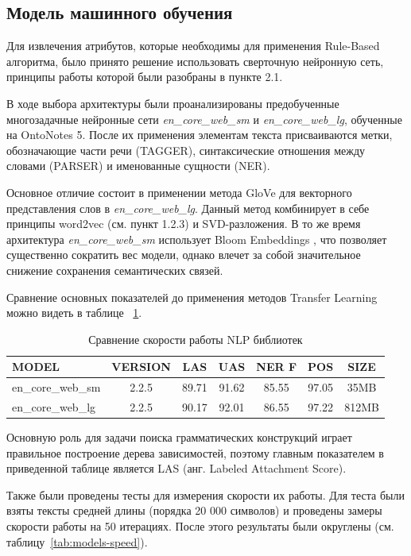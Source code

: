 \newpage
\subsection{Модель машинного обучения}
Для извлечения атрибутов, которые необходимы для применения Rule-Based алгоритма, было принято решение использовать сверточную нейронную сеть, принципы работы которой были разобраны в пункте 2.1.

В ходе выбора архитектуры были проанализированы предобученные многозадачные нейронные сети \emph{en\_core\_web\_sm} и  \emph{en\_core\_web\_lg}, обученные на OntoNotes 5. После их применения элементам текста присваиваются метки, обозначающие части речи (TAGGER), синтаксические отношения между словами (PARSER) и именованные сущности (NER).

Основное отличие состоит в применении метода GloVe \autocite{pennington2014glove} для векторного представления слов в \emph{en\_core\_web\_lg}. Данный метод комбинирует в себе принципы word2vec (см. пункт 1.2.3) и SVD-разложения. В то же время архитектура \emph{en\_core\_web\_sm} использует Bloom Embeddings \autocite{DBLP:journals/corr/SerraK17}, что позволяет существенно сократить вес модели, однако влечет за собой значительное снижение сохранения семантических связей. 

Сравнение основных показателей до применения методов Transfer Learning можно видеть в таблице ~\ref{tab:nlp-characteristics}.

\begin{table}
\centering
\caption{\label{tab:nlp-characteristics}Сравнение скорости работы NLP библиотек}
\begin{tabular}{@{}lcccccc@{}}
\toprule
MODEL             & VERSION & LAS   & UAS   & NER F & POS   & SIZE  \\ \midrule
en\_core\_web\_sm & 2.2.5   & 89.71 & 91.62 & 85.55 & 97.05 & 35MB  \\
en\_core\_web\_lg & 2.2.5   & 90.17 & 92.01 & 86.55 & 97.22 & 812MB \\ \bottomrule
\end{tabular}
\end{table}
Основную роль для задачи поиска грамматических конструкций играет правильное построение дерева зависимостей, поэтому главным показателем в приведенной таблице является LAS (анг. Labeled Attachment Score).

Также были проведены тесты для измерения скорости их работы. Для теста были взяты тексты средней длины (порядка 20 000 символов) и проведены замеры скорости работы на 50 итерациях. После этого результаты были округлены (см. таблицу~\ref{tab:models-speed}). 

